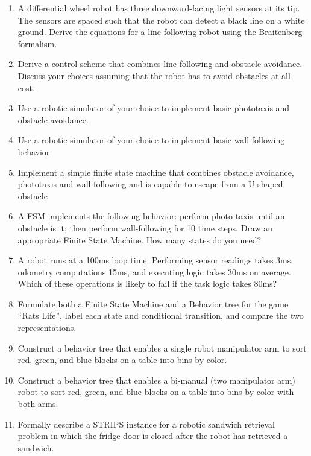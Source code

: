 \begin{enumerate}
\item A differential wheel robot has three downward-facing light sensors at its tip. The sensors are spaced such that the robot can detect a black line on a white ground. Derive the equations for a line-following robot using the Braitenberg formalism.
\item Derive a control scheme that combines line following and obstacle avoidance. Discuss your choices assuming that the robot has to avoid obstacles at all cost.
\item Use a robotic simulator of your choice to implement basic phototaxis and obstacle avoidance.
\item Use a robotic simulator of your choice to implement basic wall-following behavior
\item Implement a simple finite state machine that combines obstacle avoidance, phototaxis and wall-following and is capable to escape from a U-shaped obstacle
\item A FSM implements the following behavior: perform photo-taxis until an obstacle is it; then perform wall-following for 10 time steps. Draw an appropriate Finite State Machine. How many states do you need?
\item A robot runs at a 100ms loop time. Performing sensor readings takes 3ms, odometry computations 15ms, and executing logic takes 30ms on average. Which of these operations is likely to fail if the task logic takes 80ms?
\item Formulate both a Finite State Machine and a Behavior tree for the game ``Rats Life'', label each state and conditional transition, and compare the two representations.
\item Construct a behavior tree that enables a single robot manipulator arm to sort red, green, and blue blocks on a table into bins by color.
\item Construct a behavior tree that enables a bi-manual (two manipulator arm) robot to sort red, green, and blue blocks on a table into bins by color with both arms.
\item Formally describe a STRIPS instance for a robotic sandwich retrieval problem in which the fridge door is closed after the robot has retrieved a sandwich. 
\end{enumerate}\normalsize
